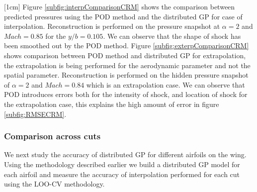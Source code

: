 [1cm]
Figure \ref{subfig:interpComparisonCRM} shows the comparison between predicted pressures using the POD method and the distributed GP for case of interpolation. Reconstruction is performed on the pressure snapshot at $\alpha = 2$ and $Mach = 0.85$ for the $y/b = 0.105$. We can observe that the shape of shock has been smoothed out by the POD method. Figure \ref{subfig:exterpComparisonCRM} shows comparison between POD method and distributed GP for extrapolation, the extrapolation is being performed for the aerodynamic parameter and not the spatial parameter. Reconstruction is performed on the hidden pressure snapshot of $\alpha = 2$ and $Mach = 0.84$ which is an extrapolation case. We can observe that POD introduces errors both for the intensity of shock, and location of shock for the extrapolation case, this explains the high amount of error in figure \ref{subfig:RMSECRM}.  

\subsubsection{Comparison across cuts}
We next study the accuracy of distributed GP for different airfoils on the wing. Using the methodology described earlier we build a distributed GP model for each airfoil and measure the accuracy of interpolation performed for each cut using the LOO-CV methodology. 

